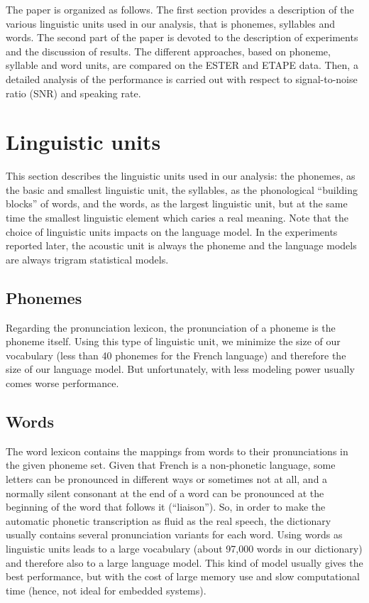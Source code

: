 \documentclass[runningheads,a4paper]{llncs}
\begin{document}
The paper is organized as follows. The first section
provides a description of the various linguistic units used in our
analysis, that is phonemes, syllables and words. The second part of the paper
is devoted to the description of experiments and the discussion of results. 
The different approaches, based on phoneme, syllable and word units, are compared 
on the ESTER and ETAPE data. Then, a detailed analysis of the performance is carried 
out with respect to signal-to-noise ratio (SNR) and speaking rate.


\section{Linguistic units}

This section describes the linguistic units used in our analysis:
the phonemes, as the basic and smallest linguistic unit, the syllables,
as the phonological ``building blocks'' of words,
and the words, as the largest linguistic unit, but at the same time
the smallest linguistic element which caries a real meaning. Note
that the choice of linguistic units impacts on the language model. 
In the experiments reported later, the acoustic unit is always the phoneme
and the language models are always trigram statistical models.


\subsection{Phonemes}

Regarding the pronunciation lexicon, the pronunciation of a phoneme
is the phoneme itself. Using this type of linguistic unit, we minimize
the size of our vocabulary (less than 40 phonemes for the French language)
and therefore the size of our language model. But unfortunately, with
less modeling power usually comes worse performance.


\subsection{Words}

The word lexicon contains the mappings from words to their pronunciations
in the given phoneme set. Given that French is a non-phonetic language,
some letters can be pronounced in different ways or sometimes not
at all, and a normally silent consonant at the end of a word can be
pronounced at the beginning of the word that follows it (``liaison'').
So, in order to make the automatic phonetic transcription as fluid
as the real speech, the dictionary usually contains several pronunciation
variants for each word. Using words as linguistic units leads to
a large vocabulary (about 97,000 words in our dictionary) and therefore
also to a large language model. This kind of model usually gives the
best performance, but with the cost of large memory use and slow computational
time (hence, not ideal for embedded systems).
\end{document}

